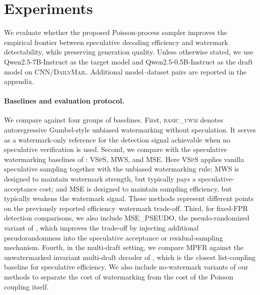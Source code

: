 
\section{Experiments}
\label{sec::experiments}

We evaluate whether the proposed Poisson-process sampler improves the empirical
frontier between speculative decoding efficiency and watermark detectability, while
preserving generation quality. Unless otherwise stated, we use Qwen2.5-7B-Instruct as
the target model and Qwen2.5-0.5B-Instruct as the draft model on
\textsc{CNN/DailyMail}. Additional model--dataset pairs are reported in the appendix.

\paragraph{Baselines and evaluation protocol.}
We compare against four groups of baselines. First, \textsc{basic\_uwm} denotes
autoregressive Gumbel-style unbiased watermarking without speculation. It serves as
a watermark-only reference for the detection signal achievable when no speculative
verification is used. Second, we compare with the speculative watermarking baselines
of \citet{hu2024inevitable}: \textsc{VSpS}, \textsc{MWS}, and \textsc{MSE}.
Here \textsc{VSpS} applies vanilla speculative sampling together with the unbiased
watermarking rule; \textsc{MWS} is designed to maintain watermark strength, but
typically pays a speculative-acceptance cost; and \textsc{MSE} is designed to
maintain sampling efficiency, but typically weakens the watermark signal. These
methods represent different points on the previously reported
efficiency--watermark trade-off. Third, for fixed-FPR detection comparisons, we also
include \textsc{MSE\_PSEUDO}, the pseudo-randomized variant of
\citet{he2026improving}, which improves the trade-off by injecting additional
pseudorandomness into the speculative acceptance or residual-sampling mechanism.
Fourth, in the multi-draft setting, we compare \textsc{MPFR} against the
unwatermarked invariant multi-draft decoder of \citet{rowan2025list}, which is the
closest list-coupling baseline for speculative efficiency. We also include
no-watermark variants of our methods to separate the cost of watermarking from the
cost of the Poisson coupling itself.


